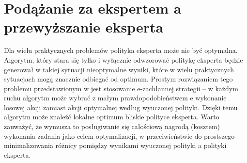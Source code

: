 \section{Podążanie za ekspertem a przewyższanie eksperta}
Dla wielu praktycznych problemów polityka eksperta może nie być optymalna. Algorytm, który stara się tylko i wyłącznie odwzorować politykę eksperta będzie generował w takiej sytuacji nieoptymalne wyniki, które w wielu praktycznych sytuacjach mogą znacznie odbiegać od optimum. Prostym rozwiązaniem tego problemu przedstawionym w \cite{DBLP:journals/corr/ChangKADL15} jest stosowanie e-zachłannej strategii – w każdym ruchu algorytm może wybrać z małym prawdopodobieństwem e wykonanie losowej akcji zamiast akcji optymalnej według wyuczonej polityki. Dzięki temu algorytm może znaleźć lokalne optimum bliskie polityce eksperta. Warto zauważyć, że wymusza to posługiwanie się całościową nagrodą (kosztem) wykonania zadania jako celem optymalizacji, w przeciwieństwie do prostszego minimalizowania różnicy pomiędzy wynikami wyuczonej polityki a polityki eksperta.
